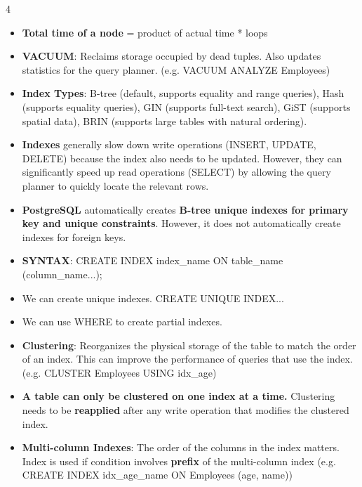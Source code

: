 \documentclass[10pt, landscape]{article}
\begin{document}
\begin{multicols*}{4}
\begin{itemize}
    \item \textbf{Total time of a node} = product of actual time * loops
    \item \textbf{VACUUM}: Reclaims storage occupied by dead tuples. Also updates statistics for the query planner. (e.g. VACUUM ANALYZE Employees)
    \item \textbf{Index Types}: B-tree (default, supports equality and range queries), Hash (supports equality queries), GIN (supports full-text search), GiST (supports spatial data), BRIN (supports large tables with natural ordering).
    \item \textbf{Indexes} generally slow down write operations (INSERT, UPDATE, DELETE) because the index also needs to be updated. However, they can significantly speed up read operations (SELECT) by allowing the query planner to quickly locate the relevant rows.
    \item \textbf{PostgreSQL} automatically creates \textbf{B-tree unique indexes for primary key and unique constraints}. However, it does not automatically create indexes for foreign keys.
    \item \textbf{SYNTAX}: CREATE INDEX index\_name ON table\_name (column\_name...);
    \item We can create unique indexes. CREATE UNIQUE INDEX...
    \item We can use WHERE to create partial indexes.
    \item \textbf{Clustering}: Reorganizes the physical storage of the table to match the order of an index. This can improve the performance of queries that use the index. (e.g. CLUSTER Employees USING idx\_age)
    \item \textbf{A table can only be clustered on one index at a time.} Clustering needs to be \textbf{reapplied} after any write operation that modifies the clustered index.
    \item \textbf{Multi-column Indexes}: The order of the columns in the index matters. Index is used if condition involves \textbf{prefix} of the multi-column index (e.g. CREATE INDEX idx\_age\_name ON Employees (age, name))
   \end{itemize}


\end{multicols*}
\end{document}
